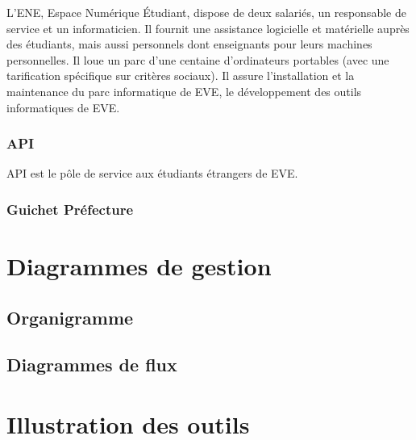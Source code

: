 L'ENE, Espace Numérique Étudiant, dispose de deux salariés, un
responsable de service et un informaticien.
Il fournit une assistance logicielle et matérielle auprès des étudiants,
mais aussi personnels dont enseignants pour leurs machines personnelles.
Il loue un parc d'une centaine d'ordinateurs portables (avec une tarification
spécifique sur critères sociaux). Il assure l'installation et la maintenance
du parc informatique de EVE, le développement des outils informatiques de EVE.

\subsubsection{API}

API est le pôle de service aux étudiants étrangers de EVE.

\subsubsection{Guichet Préfecture}

\section{Diagrammes de gestion}
\subsection{Organigramme}

\subsection{Diagrammes de flux}



\section{Illustration des outils}
